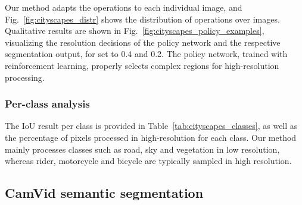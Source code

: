 Our method adapts the operations to each individual image, and Fig.~\ref{fig:cityscapes_distr} shows the distribution of operations over images.
Qualitative results are shown in Fig.~\ref{fig:cityscapes_policy_examples}, visualizing the resolution decisions of the policy network and the respective segmentation output, for  set to 0.4 and 0.2. The policy network, trained with reinforcement learning, properly selects complex regions for high-resolution processing. 

\subsubsection{Per-class analysis}
The IoU result per class is provided in Table~\ref{tab:cityscapes_classes}, as well as the percentage of pixels processed in high-resolution for each class. Our method mainly processes classes such as road, sky and vegetation in low resolution, whereas rider, motorcycle and bicycle are typically sampled in high resolution.




\subsection{CamVid semantic segmentation}

